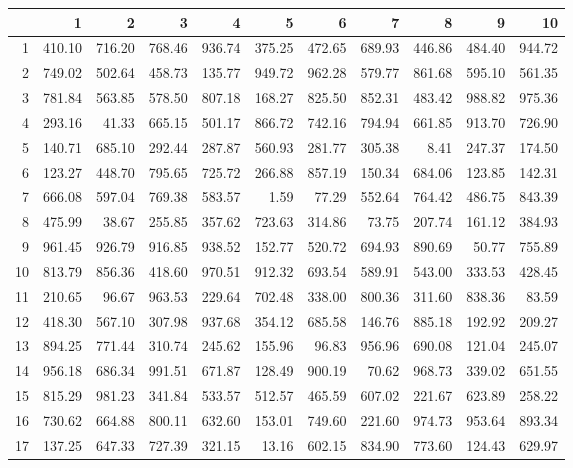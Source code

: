 \documentclass[12pt]{../SOP3_beta}\usepackage[]{graphicx}\usepackage[]{color}
\begin{document}
\begin{table}[ht]
\centering
\begin{tabular}{rrrrrrrrrrr}
  \hline
 & 1 & 2 & 3 & 4 & 5 & 6 & 7 & 8 & 9 & 10 \\ 
  \hline
1 & 410.10 & 716.20 & 768.46 & 936.74 & 375.25 & 472.65 & 689.93 & 446.86 & 484.40 & 944.72 \\ 
  2 & 749.02 & 502.64 & 458.73 & 135.77 & 949.72 & 962.28 & 579.77 & 861.68 & 595.10 & 561.35 \\ 
  3 & 781.84 & 563.85 & 578.50 & 807.18 & 168.27 & 825.50 & 852.31 & 483.42 & 988.82 & 975.36 \\ 
  4 & 293.16 & 41.33 & 665.15 & 501.17 & 866.72 & 742.16 & 794.94 & 661.85 & 913.70 & 726.90 \\ 
  5 & 140.71 & 685.10 & 292.44 & 287.87 & 560.93 & 281.77 & 305.38 & 8.41 & 247.37 & 174.50 \\ 
  6 & 123.27 & 448.70 & 795.65 & 725.72 & 266.88 & 857.19 & 150.34 & 684.06 & 123.85 & 142.31 \\ 
  7 & 666.08 & 597.04 & 769.38 & 583.57 & 1.59 & 77.29 & 552.64 & 764.42 & 486.75 & 843.39 \\ 
  8 & 475.99 & 38.67 & 255.85 & 357.62 & 723.63 & 314.86 & 73.75 & 207.74 & 161.12 & 384.93 \\ 
  9 & 961.45 & 926.79 & 916.85 & 938.52 & 152.77 & 520.72 & 694.93 & 890.69 & 50.77 & 755.89 \\ 
  10 & 813.79 & 856.36 & 418.60 & 970.51 & 912.32 & 693.54 & 589.91 & 543.00 & 333.53 & 428.45 \\ 
  11 & 210.65 & 96.67 & 963.53 & 229.64 & 702.48 & 338.00 & 800.36 & 311.60 & 838.36 & 83.59 \\ 
  12 & 418.30 & 567.10 & 307.98 & 937.68 & 354.12 & 685.58 & 146.76 & 885.18 & 192.92 & 209.27 \\ 
  13 & 894.25 & 771.44 & 310.74 & 245.62 & 155.96 & 96.83 & 956.96 & 690.08 & 121.04 & 245.07 \\ 
  14 & 956.18 & 686.34 & 991.51 & 671.87 & 128.49 & 900.19 & 70.62 & 968.73 & 339.02 & 651.55 \\ 
  15 & 815.29 & 981.23 & 341.84 & 533.57 & 512.57 & 465.59 & 607.02 & 221.67 & 623.89 & 258.22 \\ 
  16 & 730.62 & 664.88 & 800.11 & 632.60 & 153.01 & 749.60 & 221.60 & 974.73 & 953.64 & 893.34 \\ 
  17 & 137.25 & 647.33 & 727.39 & 321.15 & 13.16 & 602.15 & 834.90 & 773.60 & 124.43 & 629.97 \\ 

\end{tabular}
\end{table}
\end{document}
